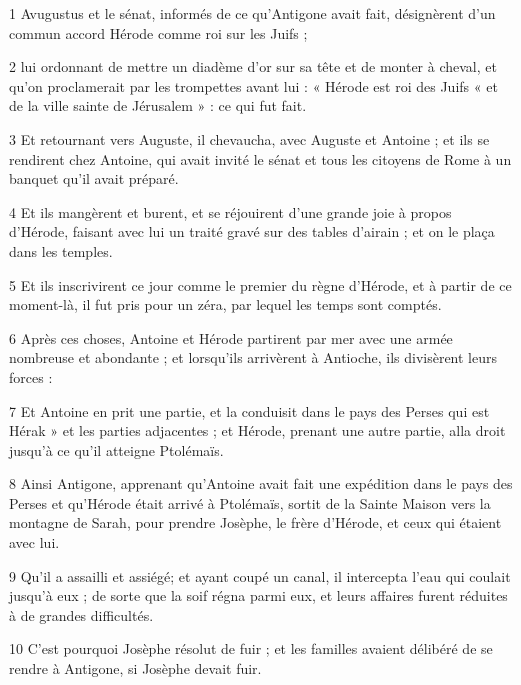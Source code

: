 \par 1 Avugustus et le sénat, informés de ce qu'Antigone avait fait, désignèrent d'un commun accord Hérode comme roi sur les Juifs ;

\par 2 lui ordonnant de mettre un diadème d'or sur sa tête et de monter à cheval, et qu'on proclamerait par les trompettes avant lui : « Hérode est roi des Juifs « et de la ville sainte de Jérusalem » : ce qui fut fait.

\par 3 Et retournant vers Auguste, il chevaucha, avec Auguste et Antoine ; et ils se rendirent chez Antoine, qui avait invité le sénat et tous les citoyens de Rome à un banquet qu'il avait préparé.

\par 4 Et ils mangèrent et burent, et se réjouirent d'une grande joie à propos d'Hérode, faisant avec lui un traité gravé sur des tables d'airain ; et on le plaça dans les temples.

\par 5 Et ils inscrivirent ce jour comme le premier du règne d'Hérode, et à partir de ce moment-là, il fut pris pour un zéra, par lequel les temps sont comptés.

\par 6 Après ces choses, Antoine et Hérode partirent par mer avec une armée nombreuse et abondante ; et lorsqu'ils arrivèrent à Antioche, ils divisèrent leurs forces :

\par 7 Et Antoine en prit une partie, et la conduisit dans le pays des Perses qui est Hérak » et les parties adjacentes ; et Hérode, prenant une autre partie, alla droit jusqu'à ce qu'il atteigne Ptolémaïs.

\par 8 Ainsi Antigone, apprenant qu'Antoine avait fait une expédition dans le pays des Perses et qu'Hérode était arrivé à Ptolémaïs, sortit de la Sainte Maison vers la montagne de Sarah, pour prendre Josèphe, le frère d'Hérode, et ceux qui étaient avec lui.

\par 9 Qu'il a assailli et assiégé; et ayant coupé un canal, il intercepta l'eau qui coulait jusqu'à eux ; de sorte que la soif régna parmi eux, et leurs affaires furent réduites à de grandes difficultés.

\par 10 C'est pourquoi Josèphe résolut de fuir ; et les familles avaient délibéré de se rendre à Antigone, si Josèphe devait fuir.

